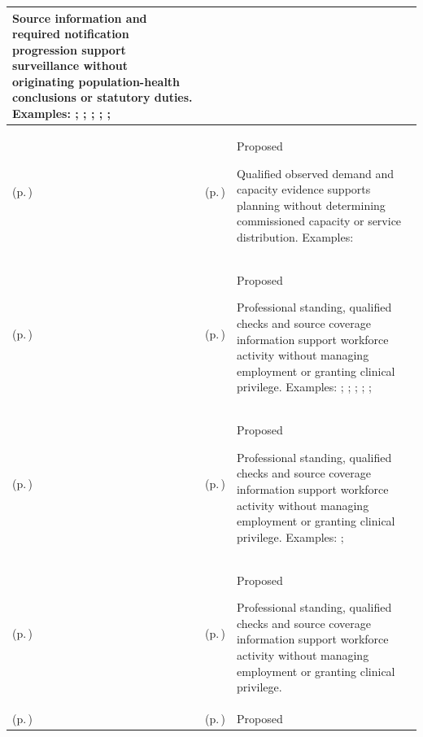 \begin{longtable}{|>{\raggedright\arraybackslash}p{0.27\TableWidth}|>{\raggedright\arraybackslash}p{0.27\TableWidth}|>{\raggedright\arraybackslash}p{0.46\TableWidth}|}
Source information and required notification progression support surveillance without originating population-health conclusions or statutory duties. Examples: \nameref{feature:feat-ise-08}; \nameref{feature:feat-ise-09}; \nameref{function:search-health-information}; \nameref{service:clinical-information-search-service}; \nameref{function:retrieve-health-information}; \nameref{service:clinical-resource-retrieval-service}\\\hline
\nameref{cap:bc-health-system-planning} (p.\,\pageref{cap:bc-health-system-planning}) & \nameref{cap:bec-service-planning-information-provision} (p.\,\pageref{cap:bec-service-planning-information-provision}) & Proposed

Qualified observed demand and capacity evidence supports planning without determining commissioned capacity or service distribution. Examples: \nameref{feature:demand-capacity-planning-projection}\\\hline
\nameref{cap:bc-health-workforce-management} (p.\,\pageref{cap:bc-health-workforce-management}) & \nameref{cap:bec-provider-administration} (p.\,\pageref{cap:bec-provider-administration}) & Proposed

Professional standing, qualified checks and source coverage information support workforce activity without managing employment or granting clinical privilege. Examples: \nameref{function:verify-practitioner-registration}; \nameref{service:practitioner-verification-service}; \nameref{function:govern-practitioner-profile}; \nameref{service:practitioner-directory-query}; \nameref{function:maintain-practitioner-roles}; \nameref{service:practitioner-role-resolution}\\\hline
\nameref{cap:bc-health-workforce-management} (p.\,\pageref{cap:bc-health-workforce-management}) & \nameref{cap:bec-clinical-qualification-management} (p.\,\pageref{cap:bec-clinical-qualification-management}) & Proposed

Professional standing, qualified checks and source coverage information support workforce activity without managing employment or granting clinical privilege. Examples: \nameref{feature:feat-hso-23}; \nameref{function:verify-clinical-qualification-for-work-dispatch}\\\hline
\nameref{cap:bc-health-workforce-management} (p.\,\pageref{cap:bc-health-workforce-management}) & \nameref{cap:bec-clinical-rostering} (p.\,\pageref{cap:bec-clinical-rostering}) & Proposed

Professional standing, qualified checks and source coverage information support workforce activity without managing employment or granting clinical privilege.\\\hline
\nameref{cap:bc-healthcare-organisation-service-structure-management} (p.\,\pageref{cap:bc-healthcare-organisation-service-structure-management}) & \nameref{cap:bec-organisation-administration} (p.\,\pageref{cap:bec-organisation-administration}) & Proposed


\end{longtable}
